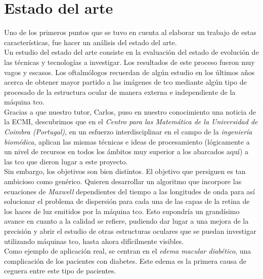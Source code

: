 \chapter{Estado del arte}
Uno de los primeros puntos que se tuvo en cuenta al elaborar un trabajo 
de estas características, fue hacer un análisis del estado del arte.\\
Un estudio del estado del arte consiste en la evaluación del estado de
evolución de las técnicas y tecnologías a investigar. Los resultados
de este proceso fueron muy vagos y escasos. Los oftalmólogos recuerdan
de algún estudio en los últimos años acerca de obtener mayor partido a
las imágenes de \gls{tco} mediante algún tipo de procesado de la
estructura ocular de manera externa e independiente de la máquina \gls{tco}.\\
Gracias a que nuestro tutor, Carlos, puso en nuestro conocimiento una
noticia de la \gls{ECMI}, descubrimos que en el \emph{Centro para las
  Matemática de la Universidad de Coimbra (Portugal)}, en un esfuerzo
interdisciplinar en el campo de la \emph{ingeniería biomédica}, aplican
las mismas técnicas e ideas de procesamiento (lógicamente a un nivel
de recursos en todos los ámbitos muy superior a los abarcados aquí) a
las \gls{tco} que dieron lugar a este proyecto. \\
Sin embargo, los objetivos son bien distintos. El objetivo que
persiguen es tan ambicioso como genérico. Quieren desarrollar un
algoritmo que incorpore las ecuaciones de \emph{Maxwell} dependientes
del tiempo a las longitudes de onda para así solucionar el problema de
dispersión para cada una de las capas de la retina de los haces de luz
emitidos por la máquina \gls{tco}. Esto supondría un grandísimo avance 
en cuanto a la calidad se refiere, pudiendo dar lugar a una mejora de 
la precisión y abrir el estudio de otras estructuras oculares que se 
puedan investigar utilizando máquinas \gls{tco}, hasta ahora difícilmente 
visibles.\\
Como ejemplo de aplicación real, se centran en el \emph{edema macular
  diabético}, una complicación de los pacientes con diabetes. Este 
edema es la primera causa de ceguera entre este tipo de pacientes.
